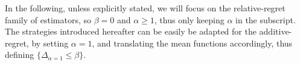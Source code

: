 \documentclass[../../Main_ManuscritThese.tex]{subfiles}
\begin{document}
In the following, unless explicitly stated, we will focus on the
relative-regret family of estimators, so $\beta=0$ and
$\alpha \geq 1$, thus only keeping $\alpha$ in the subscript.  The
strategies introduced hereafter can be easily be adapted for the
additive-regret, by setting $\alpha=1$, and translating the mean
functions accordingly, thus defining
$\{\Delta_{\alpha=1} \leq \beta \}$.



\end{document}
